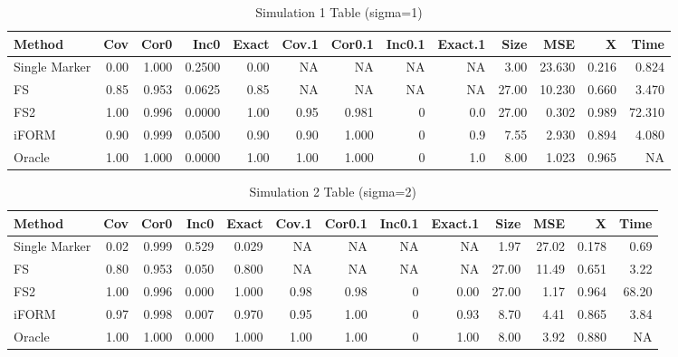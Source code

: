 \documentclass[11pt,]{book}
\theoremstyle{definition}
\theoremstyle{definition}
\theoremstyle{remark}
\begin{document}
\begin{table}

\caption{\label{tab:sim1}Simulation 1 Table (sigma=1)}
\centering
\begin{tabular}[t]{lrrrrrrrrrrrr}
\toprule
Method & Cov & Cor0 & Inc0 & Exact & Cov.1 & Cor0.1 & Inc0.1 & Exact.1 & Size & MSE & X & Time\\
\midrule
Single Marker & 0.00 & 1.000 & 0.2500 & 0.00 & NA & NA & NA & NA & 3.00 & 23.630 & 0.216 & 0.824\\
FS & 0.85 & 0.953 & 0.0625 & 0.85 & NA & NA & NA & NA & 27.00 & 10.230 & 0.660 & 3.470\\
FS2 & 1.00 & 0.996 & 0.0000 & 1.00 & 0.95 & 0.981 & 0 & 0.0 & 27.00 & 0.302 & 0.989 & 72.310\\
iFORM & 0.90 & 0.999 & 0.0500 & 0.90 & 0.90 & 1.000 & 0 & 0.9 & 7.55 & 2.930 & 0.894 & 4.080\\
Oracle & 1.00 & 1.000 & 0.0000 & 1.00 & 1.00 & 1.000 & 0 & 1.0 & 8.00 & 1.023 & 0.965 & NA\\
\bottomrule
\end{tabular}
\end{table}

\begin{table}

\caption{\label{tab:sim2}Simulation 2 Table (sigma=2)}
\centering
\begin{tabular}[t]{lrrrrrrrrrrrr}
\toprule
Method & Cov & Cor0 & Inc0 & Exact & Cov.1 & Cor0.1 & Inc0.1 & Exact.1 & Size & MSE & X & Time\\
\midrule
Single Marker & 0.02 & 0.999 & 0.529 & 0.029 & NA & NA & NA & NA & 1.97 & 27.02 & 0.178 & 0.69\\
FS & 0.80 & 0.953 & 0.050 & 0.800 & NA & NA & NA & NA & 27.00 & 11.49 & 0.651 & 3.22\\
FS2 & 1.00 & 0.996 & 0.000 & 1.000 & 0.98 & 0.98 & 0 & 0.00 & 27.00 & 1.17 & 0.964 & 68.20\\
iFORM & 0.97 & 0.998 & 0.007 & 0.970 & 0.95 & 1.00 & 0 & 0.93 & 8.70 & 4.41 & 0.865 & 3.84\\
Oracle & 1.00 & 1.000 & 0.000 & 1.000 & 1.00 & 1.00 & 0 & 1.00 & 8.00 & 3.92 & 0.880 & NA\\
\bottomrule
\end{tabular}
\end{table}
\end{document}
